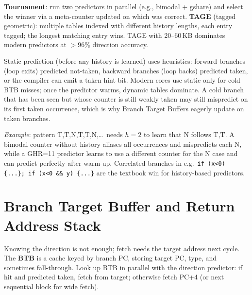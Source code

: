 \textbf{Tournament}: run two predictors in parallel (e.g., bimodal + gshare) and select the winner via a meta-counter updated on which was correct. \textbf{TAGE} (tagged geometric): multiple tables indexed with different history lengths, each entry tagged; the longest matching entry wins. TAGE with 20--60\,KB dominates modern predictors at $>96\%$ direction accuracy.

Static prediction (before any history is learned) uses heuristics: forward branches (loop exits) predicted not-taken, backward branches (loop backs) predicted taken, or the compiler can emit a taken hint bit. Modern cores use static only for cold BTB misses; once the predictor warms, dynamic tables dominate. A cold branch that has been seen but whose counter is still weakly taken may still mispredict on its first taken occurrence, which is why Branch Target Buffers eagerly update on taken branches.

\textit{Example}: pattern T,T,N,T,T,N,\dots\ needs $h=2$ to learn that N follows T,T. A bimodal counter without history aliases all occurrences and mispredicts each N, while a GHR=11 predictor learns to use a different counter for the N case and can predict perfectly after warm-up. Correlated branches in e.g.\ \texttt{if (x<0) \{...\}; if (x<0 \&\& y) \{...\}} are the textbook win for history-based predictors.

\section{Branch Target Buffer and Return Address Stack}
Knowing the direction is not enough; fetch needs the target address next cycle. The \textbf{BTB} is a cache keyed by branch PC, storing target PC, type, and sometimes fall-through. Look up BTB in parallel with the direction predictor: if hit and predicted taken, fetch from target; otherwise fetch PC+4 (or next sequential block for wide fetch).

